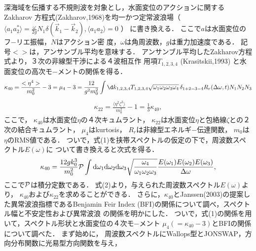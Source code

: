 \documentclass[a4,11pt]{jarticle}
\begin{document}
深海域を伝播する不規則波を対象とし，水面変位のアクションに関するZakharov
方程式(Zakharov,1968)を均一かつ定常波浪場（
$
\langle a_1 a^*_2 \rangle = \frac{\omega}{2g} N_1 
\delta(\ensuremath{\vec{k}}_1-\vec{k}_2),
\langle a_1 a_2 \rangle =0
$
）
に書き換える．
ここで$a$は水面変位のフ−リエ振幅，$N$はアクション密
度，$\omega$は角周波数，$g$は重力加速度である．
記号$<>$は，アンサンブル平均を意味する．
アンサンブル平均したZakharov方程式より，３次の非線型干渉による４波相互作
用項$T_{1,2,3,4}$ (Krasitskii,1993) と水面変位の高次モ−メントの関係を得る．
\begin{eqnarray}
 \kappa_{40}
  = \frac{<\eta^4>}{m_0^2} - 3 
  = \mu_4 - 3
=
  \frac{12}{g^2m_0^2} 
  \int
  \d k_{1,2,3,4}
  T_{1,2,3,4}\sqrt{\omega_1\omega_2\omega_3\omega_4}
  \,\delta_{1+2-3-4}
  R_r(\Delta\omega,t)
  N_1 N_2 N_3
  \label{eqn:kurtosis-03}
\end{eqnarray}
\begin{eqnarray}
 \kappa_{22}=\frac{\langle \eta^2 \zeta^2 \rangle}{m_0^2}-1
  = \frac{1}{3} \kappa_{40},
  \label{p:14}
\end{eqnarray}
ここで，
$\kappa_{40}$は水面変位$\eta$の４次キュムラント，
$\kappa_{22}$は水面変位$\eta$と包絡線$\zeta$との２次の結合キュムラント，
$\mu_4$はkurtosis，
$R_r$は非線型エネルギ−伝達関数，
$m_0$は$\eta$のRMS値である．
ついで，式(1)を挟帯スペクトルの仮定の下で，周波数スペクトル$E(\omega)$に
ついて書き換えると次式を得る．
\begin{eqnarray}
 \kappa_{40}=\frac{12gk_0^3}{m_0^2}{\cal P}\int{\rm d}\omega_1{\rm d}\omega_2
{\rm d}\omega_3
\sqrt{\frac{\omega_4}{\omega_1\omega_2\omega_3}}
 \frac{ E(\omega_1) E(\omega_2) E(\omega_3)}
 {\Delta \omega},
\label{eqn:12}
\end{eqnarray}
ここで${\cal P}$は積分定数である．
式(2)より，与えられた周波数スペクトル$E(\omega)$より，
$\kappa_{40}$および$\kappa_{22}$を求めることができる．
さらに，$\kappa_{40}$とJanssen(2003)の提案した異常波浪指標であるBenjamin
Feir Index (BFI)の関係について調べ，スペクトル幅と不安定性および異常波浪
の関係を明かにした．
ついで，式(1)の関係を用いて，スペクトル形状と水面変位の４次モ−メント
$\mu_4(=\kappa_{40}-3)$とBFIの関係について調べた．
まず始めに，
周波数スペクトルにWallops型とJONSWAP，方向分布関数に光易型方向関数を与え，
\end{document}
